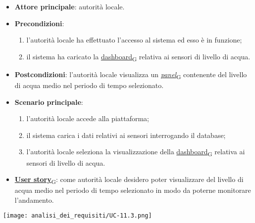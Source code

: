\begin{itemize}
	\item \textbf{Attore principale}: autorità locale.
	\item \textbf{Precondizioni}:
	      \begin{enumerate}
		      \item l'autorità locale ha effettuato l'accesso al sistema ed esso è in funzione;
		      \item il sistema ha caricato la \href{https://7last.github.io/docs/pb/documentazione-interna/glossario\#dashboard}{dashboard\textsubscript{G}} relativa ai sensori di livello di acqua.
	      \end{enumerate}
	\item \textbf{Postcondizioni}: l'autorità locale visualizza un \href{https://7last.github.io/docs/pb/documentazione-interna/glossario\#panel}{\textit{panel}\textsubscript{G}} contenente del livello di acqua medio nel periodo di tempo selezionato.
	\item \textbf{Scenario principale}:
	      \begin{enumerate}
		      \item l'autorità locale accede alla piattaforma;
		      \item il sistema carica i dati relativi ai sensori interrogando il database;
		      \item l'autorità locale seleziona la visualizzazione della \href{https://7last.github.io/docs/pb/documentazione-interna/glossario\#dashboard}{dashboard\textsubscript{G}} relativa ai sensori di livello di acqua.
	      \end{enumerate}
	\item \href{https://7last.github.io/docs/pb/documentazione-interna/glossario\#user-story}{\textbf{User story}\textsubscript{G}}:
	      come autorità locale desidero poter visualizzare del livello di acqua medio nel periodo di tempo selezionato
	      in modo da poterne monitorare l'andamento.
\end{itemize}
\begin{center}
	\texttt{[image: analisi\_dei\_requisiti/UC-11.3.png]}
\end{center}


